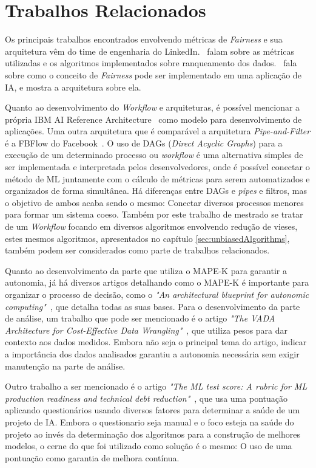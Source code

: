 \documentclass[portugues]{ic-tese}
\begin{document}
\section{Trabalhos Relacionados}

Os principais trabalhos encontrados envolvendo métricas de \textit{Fairness} e sua arquitetura vêm do time de engenharia do LinkedIn.~\citet{Geyik_2019} falam sobre as métricas utilizadas e os algoritmos implementados sobre ranqueamento dos dados.~\citet{Kenthapadi_2019} fala sobre como o conceito de \textit{Fairness} pode ser implementado em uma aplicação de IA, e mostra a arquitetura sobre ela.

Quanto ao desenvolvimento do \textit{Workflow} e arquiteturas, é possível mencionar a própria IBM AI Reference Architecture~\citep{IBM_2021} como modelo para desenvolvimento de aplicações. Uma outra arquitetura que é comparável a arquitetura \textit{Pipe-and-Filter} é a FBFlow do Facebook~\citep{Dunn_2016}. O uso de DAGs (\textit{Direct Acyclic Graphs}) para a execução de um determinado processo ou \textit{workflow} é uma alternativa simples de ser implementada e interpretada pelos desenvolvedores, onde é possível conectar o método de ML juntamente com o cálculo de métricas para serem automatizados e organizados de forma simultânea. Há diferenças entre DAGs e \textit{pipes} e filtros, mas o objetivo de ambos acaba sendo o mesmo: Conectar diversos processos menores para formar um sistema coeso. Também por este trabalho de mestrado se tratar de um \textit{Workflow} focando em diversos algoritmos envolvendo redução de vieses, estes mesmos algoritmos, apresentados no capítulo \ref{sec:unbiasedAlgorithms}, também podem ser considerados como parte de trabalhos relacionados.

Quanto ao desenvolvimento da parte que utiliza o MAPE-K para garantir a autonomia, já há diversos artigos detalhando como o MAPE-K é importante para organizar o processo de decisão, como o \textit{"An architectural blueprint for autonomic computing"}~\citep{IBM_2005}, que detalha todas as suas bases. Para o desenvolvimento da parte de análise, um trabalho que pode ser mencionado é o artigo \textit{"The VADA Architecture for Cost-Effective Data Wrangling"}~\citep{Konstantinou_2017}, que utiliza pesos para dar contexto aos dados medidos. Embora não seja o principal tema do artigo, indicar a importância dos dados analisados garantiu a autonomia necessária sem exigir manutenção na parte de análise.

Outro trabalho a ser mencionado é o artigo \textit{"The ML test score: A rubric for ML production readiness and technical debt reduction"}~\citep{Breck_2017}, que usa uma pontuação aplicando questionários usando diversos fatores para determinar a saúde de um projeto de IA. Embora o questionario seja manual e o foco esteja na saúde do projeto ao invés da determinação dos algoritmos para a construção de melhores modelos, o cerne do que foi utilizado como solução é o mesmo: O uso de uma pontuação como garantia de melhora contínua.
\end{document}
